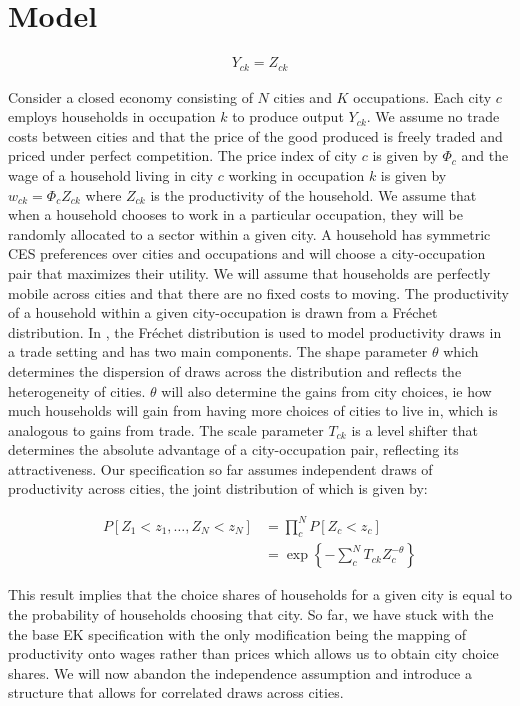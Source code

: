 \documentclass[10pt]{article}
\begin{document}
\section{Model}

\begin{align*}
    Y_{ck} = Z_{ck}
\end{align*}

Consider a closed economy consisting of $N$ cities and $K$ occupations. Each city $c$ employs households in occupation $k$ to produce output $Y_{ck}$. We assume no trade costs between cities and that the price of the good produced is freely traded and priced under perfect competition. The price index of city $c$ is given by $\Phi_c$ and the wage of a household living in city $c$ working in occupation $k$ is given by $w_{ck} = \Phi_c Z_{ck}$ where $Z_{ck}$ is the productivity of the household. We assume that when a household chooses to work in a particular occupation, they will be randomly allocated to a sector within a given city. A household has symmetric CES preferences over cities and occupations and will choose a city-occupation pair that maximizes their utility. We will assume that households are perfectly mobile across cities and that there are no fixed costs to moving. The productivity of a household within a given city-occupation is drawn from a Fr\'{e}chet distribution. In \cite{ek}, the Fr\'{e}chet distribution is used to model productivity draws in a trade setting and has two main components. The shape parameter $\theta$ which determines the dispersion of draws across the distribution and reflects the heterogeneity of cities. $\theta$ will also determine the gains from city choices, ie how much households will gain from having more choices of cities to live in, which is analogous to gains from trade. The scale parameter $T_{ck}$ is a level shifter that determines the absolute advantage of a city-occupation pair, reflecting its attractiveness. Our specification so far assumes independent draws of productivity across cities, the joint distribution of which is given by:

\begin{align*}
    P[Z_1 < z_1, \dots, Z_N < z_N] & = \prod_{c}^{N} P[Z_c < z_c]                                 \\
                                   & = \exp \left\{ - \sum_{c}^{N} T_{ck} Z_c^{- \theta} \right\}
\end{align*}

This result implies that the choice shares of households for a given city is equal to the probability of households choosing that city. So far, we have stuck with the the base EK specification with the only modification being the mapping of productivity onto wages rather than prices which allows us to obtain city choice shares. We will now abandon the independence assumption and introduce a structure that allows for correlated draws across cities.
\end{document}
